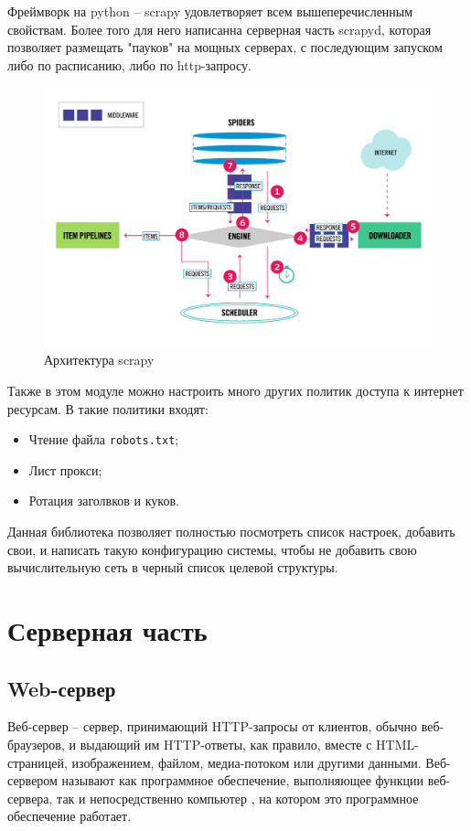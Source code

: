 Фреймворк на python -- scrapy удовлетворяет всем вышеперечисленным свойствам.
Более того для него написанна серверная часть scrapyd, которая позволяет
размещать "пауков" на мощных серверах, с последующим запуском либо по
расписанию, либо по http-запросу.
\begin{figure}[H]
    \centering
    \includegraphics[scale=0.35]{inc/img/scrapy_architecture.png}
    \caption{Архитектура scrapy}
\end{figure}

Также в этом модуле можно настроить много других политик доступа к интернет ресурсам. В такие политики входят:
\begin{itemize}
    \item Чтение файла \verb|robots.txt|;
    \item Лист прокси;
    \item Ротация заголвков и куков.
\end{itemize}

Данная библиотека позволяет полностью посмотреть список настроек, добавить свои,
и написать такую конфигурацию системы, чтобы не добавить свою вычислительную
сеть в черный список целевой структуры.

\section{Серверная часть}
\subsection{Web-сервер}
Веб-сервер -- сервер, принимающий HTTP-запросы от клиентов, обычно веб-браузеров,
и выдающий им HTTP-ответы, как правило, вместе с HTML-страницей, изображением,
файлом, медиа-потоком или другими данными. Веб-сервером называют как программное
обеспечение, выполняющее функции веб-сервера, так и непосредственно компьютер ,
на котором это программное обеспечение работает.

